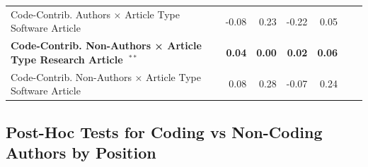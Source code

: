\documentclass[
  letterpaper,
  DIV=11,
  numbers=noendperiod]{scrartcl}
\begin{document}
\begin{table}
{{\begin{tabular}{l*{6}{r}}
    \cellcolor{white}Code-Contrib. Authors × Article Type Software Article & \cellcolor{white}-0.08 & \cellcolor{white}0.23 & \cellcolor{white}-0.22 & \cellcolor{white}0.05 \\
    \bfseries\cellcolor{gray!10}Code-Contrib. Non-Authors × Article Type Research Article~$^{**}$ & \bfseries\cellcolor{gray!10}0.04 & \bfseries\cellcolor{gray!10}0.00 & \bfseries\cellcolor{gray!10}0.02 & \bfseries\cellcolor{gray!10}0.06 \\
    \cellcolor{white}Code-Contrib. Non-Authors × Article Type Software Article & \cellcolor{white}0.08 & \cellcolor{white}0.28 & \cellcolor{white}-0.07 & \cellcolor{white}0.24 \\
\bottomrule
\end{tabular}
}

}

\end{table}%

\subsection{Post-Hoc Tests for Coding vs Non-Coding Authors by
Position}\label{post-hoc-tests-for-coding-vs-non-coding-authors-by-position}
\end{document}
